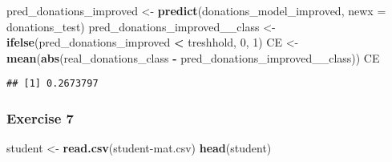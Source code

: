 \documentclass[
]{article}
\newenvironment{Shaded}{\begin{snugshade}}{\end{snugshade}}
\newcommand{\AttributeTok}[1]{\textcolor[rgb]{0.13,0.29,0.53}{#1}}
\newcommand{\DecValTok}[1]{\textcolor[rgb]{0.00,0.00,0.81}{#1}}
\newcommand{\FunctionTok}[1]{\textcolor[rgb]{0.13,0.29,0.53}{\textbf{#1}}}
\newcommand{\NormalTok}[1]{#1}
\newcommand{\OtherTok}[1]{\textcolor[rgb]{0.56,0.35,0.01}{#1}}
\newcommand{\SpecialCharTok}[1]{\textcolor[rgb]{0.81,0.36,0.00}{\textbf{#1}}}
\newcommand{\StringTok}[1]{\textcolor[rgb]{0.31,0.60,0.02}{#1}}
\begin{document}
\begin{Shaded}
\begin{Highlighting}[]
\NormalTok{pred\_donations\_improved }\OtherTok{\textless{}{-}} \FunctionTok{predict}\NormalTok{(donations\_model\_improved, }\AttributeTok{newx =}\NormalTok{ donations\_test)}
\NormalTok{pred\_donations\_improved\_\_class }\OtherTok{\textless{}{-}} \FunctionTok{ifelse}\NormalTok{(pred\_donations\_improved }\SpecialCharTok{\textless{}}\NormalTok{ treshhold, }\DecValTok{0}\NormalTok{, }\DecValTok{1}\NormalTok{)}
\NormalTok{CE }\OtherTok{\textless{}{-}} \FunctionTok{mean}\NormalTok{(}\FunctionTok{abs}\NormalTok{(real\_donations\_class }\SpecialCharTok{{-}}\NormalTok{ pred\_donations\_improved\_\_class))}
\NormalTok{CE}
\end{Highlighting}
\end{Shaded}

\begin{verbatim}
## [1] 0.2673797
\end{verbatim}

\subsubsection{Exercise 7}\label{exercise-7}

\begin{Shaded}
\begin{Highlighting}[]
\NormalTok{student }\OtherTok{\textless{}{-}} \FunctionTok{read.csv}\NormalTok{(}\StringTok{\textquotesingle{}student{-}mat.csv\textquotesingle{}}\NormalTok{)}
\FunctionTok{head}\NormalTok{(student)}
\end{Highlighting}
\end{Shaded}
\end{document}
